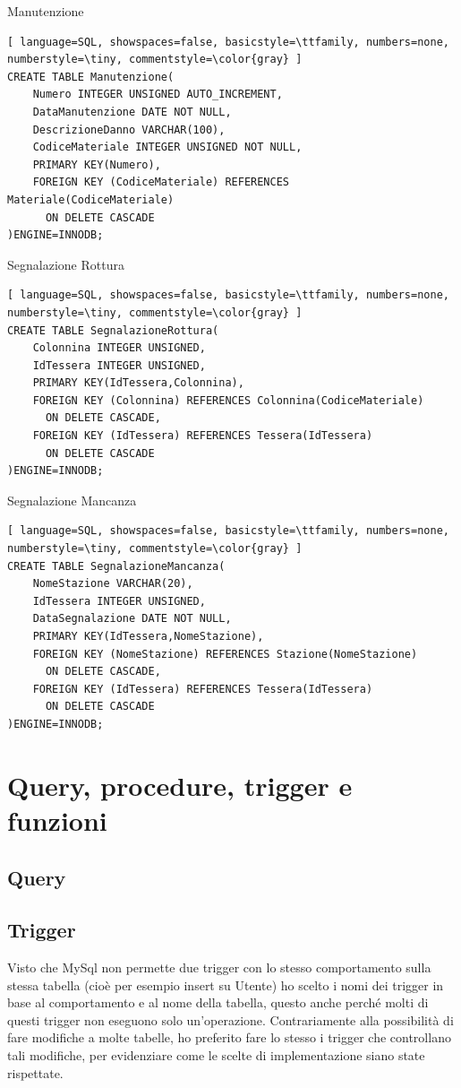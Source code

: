 \documentclass[a4paper,twoside]{article}
\begin{document}
Manutenzione
\begin{lstlisting}[ language=SQL, showspaces=false, basicstyle=\ttfamily, numbers=none, numberstyle=\tiny, commentstyle=\color{gray} ]
CREATE TABLE Manutenzione(
	Numero INTEGER UNSIGNED AUTO_INCREMENT,
	DataManutenzione DATE NOT NULL,
	DescrizioneDanno VARCHAR(100),
	CodiceMateriale INTEGER UNSIGNED NOT NULL,
	PRIMARY KEY(Numero),
	FOREIGN KEY (CodiceMateriale) REFERENCES Materiale(CodiceMateriale)
	  ON DELETE CASCADE
)ENGINE=INNODB;
\end{lstlisting}
Segnalazione Rottura
\begin{lstlisting}[ language=SQL, showspaces=false, basicstyle=\ttfamily, numbers=none, numberstyle=\tiny, commentstyle=\color{gray} ]
CREATE TABLE SegnalazioneRottura(
	Colonnina INTEGER UNSIGNED,
	IdTessera INTEGER UNSIGNED,
	PRIMARY KEY(IdTessera,Colonnina),
	FOREIGN KEY (Colonnina) REFERENCES Colonnina(CodiceMateriale)
	  ON DELETE CASCADE,
	FOREIGN KEY (IdTessera) REFERENCES Tessera(IdTessera)
	  ON DELETE CASCADE
)ENGINE=INNODB;
\end{lstlisting}
Segnalazione Mancanza
\begin{lstlisting}[ language=SQL, showspaces=false, basicstyle=\ttfamily, numbers=none, numberstyle=\tiny, commentstyle=\color{gray} ]
CREATE TABLE SegnalazioneMancanza(
	NomeStazione VARCHAR(20),
	IdTessera INTEGER UNSIGNED,
	DataSegnalazione DATE NOT NULL,
	PRIMARY KEY(IdTessera,NomeStazione),
	FOREIGN KEY (NomeStazione) REFERENCES Stazione(NomeStazione)
	  ON DELETE CASCADE,
	FOREIGN KEY (IdTessera) REFERENCES Tessera(IdTessera)
	  ON DELETE CASCADE
)ENGINE=INNODB;
\end{lstlisting}
\section{Query, procedure, trigger e funzioni} %
\subsection{Query}
\subsection{Trigger}
Visto che MySql non permette due trigger con lo stesso comportamento sulla stessa tabella (cioè per esempio insert su Utente) ho scelto i nomi dei trigger in base al comportamento e al nome della tabella, questo anche perché molti di questi trigger non eseguono solo un'operazione.\newline
Contrariamente alla possibilità di fare modifiche a molte tabelle, ho preferito fare lo stesso i trigger che controllano tali modifiche, per evidenziare come le scelte di implementazione siano state rispettate.
\end{document}
